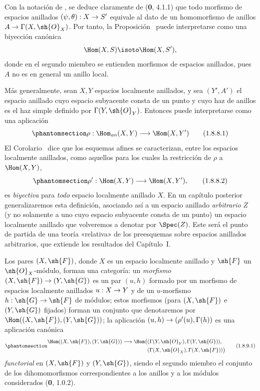 \documentclass[oneside,10pt]{amsart}
\makeatletter
\newcommand{\ega@arrow}[2]{\mathchoice{#1}{#2}{#2}{#2}}
\renewcommand{\to}{\ega@arrow{\longrightarrow}{\rightarrow}}
\newcommand{\oldpage}[2][]{\marginnote{\normalfont\footnotesize\textbf{#1}~|~#2}\ignorespaces}
\let\EGAOriginalLabel\label
\renewcommand{\label}[1]{\phantomsection\EGAOriginalLabel{#1}}
\makeatother
\begin{document}
\begin{env}[1.8.8]
\label{ega2:addendum:I.1.8.8}
Con la notación de , se deduce claramente de
(\textbf 0, 4.1.1) que todo morfismo de espacios anillados
$(\psi,\theta):X\to S'$ equivale al dato de un homomorfismo de
anillos $A\to\Gamma(X,\sh{O}_X)$. Por tanto, la
Proposición~ puede interpretarse como una biyección
canónica
\[
  \Hom(X,S)\isoto\Hom(X,S'),
\]
donde en el segundo miembro se entienden morfismos de espacios
anillados, pues $A$ no es en general un anillo local.

Más generalmente, sean $X,Y$ espacios localmente anillados, y sea
$(Y',A')$ el espacio anillado cuyo espacio subyacente consta de un
punto y cuyo haz de anillos es el haz simple definido por
$\Gamma(Y,\sh{O}_Y)$. Entonces  puede interpretarse
como una aplicación
\begin{equation}
\label{ega2:addendum:I.1.8.8.1}
  \rho:\Hom_{\mathit{an}}(X,Y)\to\Hom(X,Y')
\tag{1.8.8.1}
\end{equation}
El Corolario~ dice que los esquemas afines se
caracterizan, entre los espacios localmente anillados, como aquellos
para los cuales la restricción de $\rho$ a $\Hom(X,Y)$,
\begin{equation}
\label{ega2:addendum:I.1.8.8.2}
  \rho':\Hom(X,Y)\to\Hom(X,Y'),
\tag{1.8.8.2}
\end{equation}
es \emph{biyectiva} para \emph{todo} espacio localmente anillado $X$. En un capítulo
posterior generalizaremos esta definición, asociando así a un espacio
anillado \emph{arbitrario} $Z$ (y no solamente a uno cuyo espacio subyacente
consta de un punto) un espacio localmente anillado que volveremos a
denotar por $\Spec(Z)$. Este será el punto de partida de una teoría
«relativa» de los preesquemas sobre espacios anillados arbitrarios,
que extiende los resultados del Capítulo~I.
\end{env}

\begin{env}[1.8.9]
\label{ega2:addendum:I.1.8.9}
Los pares $(X,\sh{F})$, donde $X$ es un espacio localmente anillado y
$\sh{F}$ un $\sh{O}_X$-módulo, forman una categoría: un \emph{morfismo}
$(X,\sh{F})\to(Y,\sh{G})$ es un par $(u,h)$ formado por un morfismo de
\oldpage[II]{221}
espacios localmente anillados $u:X\to Y$ y de un $u$-morfismo
$h:\sh{G}\to\sh{F}$ de módulos; estos
morfismos (para $(X,\sh{F})$ e $(Y,\sh{G})$ fijados) forman un conjunto
que denotaremos por $\Hom((X,\sh{F}),(Y,\sh{G}))$; la aplicación
$(u,h)\to(\rho'(u),\Gamma(h))$ es una aplicación canónica
\begin{equation}
\label{ega2:addendum:I.1.8.9.1}
\begin{split}
  \Hom((X,\sh{F}),(Y,\sh{G}))\to
  \Hom\bigl(
    &(\Gamma(Y,\sh{O}_Y),\Gamma(Y,\sh{G})),\\
    &(\Gamma(X,\sh{O}_X),\Gamma(X,\sh{F}))
  \bigr)
\end{split}
\tag{1.8.9.1}
\end{equation}
\emph{functorial} en $(X,\sh{F})$ y $(Y,\sh{G})$, siendo el segundo miembro
el conjunto de los dihomomorfismos correspondientes a los anillos y a
los módulos considerados (\textbf 0, 1.0.2).
\end{env}
\end{document}
